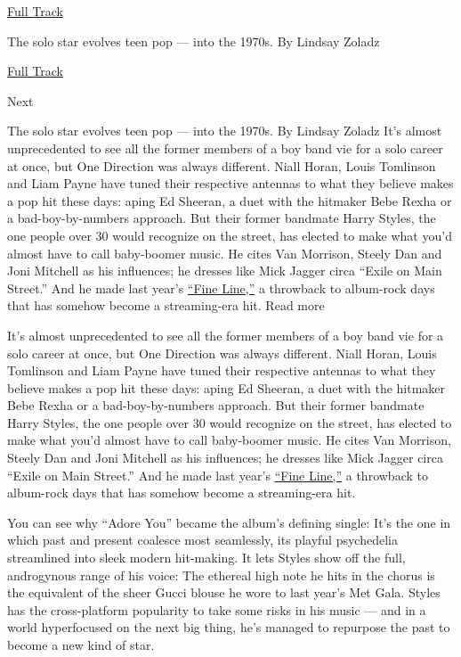 \href{https://open.spotify.com/track/1M4qEo4HE3PRaCOM7EXNJq?si=RynkgC_oSaCIc7mojYTzhA}{
Full Track}

The solo star evolves teen pop --- into the 1970s. By Lindsay Zoladz

\href{https://open.spotify.com/track/1M4qEo4HE3PRaCOM7EXNJq?si=RynkgC_oSaCIc7mojYTzhA}{Full
Track }

Next

The solo star evolves teen pop --- into the 1970s. By Lindsay Zoladz
It's almost unprecedented to see all the former members of a boy band
vie for a solo career at once, but One Direction was always different.
Niall Horan, Louis Tomlinson and Liam Payne have tuned their respective
antennas to what they believe makes a pop hit these days: aping Ed
Sheeran, a duet with the hitmaker Bebe Rexha or a bad-boy-by-numbers
approach. But their former bandmate Harry Styles, the one people over 30
would recognize on the street, has elected to make what you'd almost
have to call baby-boomer music. He cites Van Morrison, Steely Dan and
Joni Mitchell as his influences; he dresses like Mick Jagger circa
``Exile on Main Street.'' And he made last year's
\href{https://www.nytimes3xbfgragh.onion/2019/12/23/arts/music/harry-styles-fine-line-billboard.html}{``Fine
Line,''} a throwback to album-rock days that has somehow become a
streaming-era hit. Read more

It's almost unprecedented to see all the former members of a boy band
vie for a solo career at once, but One Direction was always different.
Niall Horan, Louis Tomlinson and Liam Payne have tuned their respective
antennas to what they believe makes a pop hit these days: aping Ed
Sheeran, a duet with the hitmaker Bebe Rexha or a bad-boy-by-numbers
approach. But their former bandmate Harry Styles, the one people over 30
would recognize on the street, has elected to make what you'd almost
have to call baby-boomer music. He cites Van Morrison, Steely Dan and
Joni Mitchell as his influences; he dresses like Mick Jagger circa
``Exile on Main Street.'' And he made last year's
\href{https://www.nytimes3xbfgragh.onion/2019/12/23/arts/music/harry-styles-fine-line-billboard.html}{``Fine
Line,''} a throwback to album-rock days that has somehow become a
streaming-era hit.

You can see why ``Adore You'' became the album's defining single: It's
the one in which past and present coalesce most seamlessly, its playful
psychedelia streamlined into sleek modern hit-making. It lets Styles
show off the full, androgynous range of his voice: The ethereal high
note he hits in the chorus is the equivalent of the sheer Gucci blouse
he wore to last year's Met Gala. Styles has the cross-platform
popularity to take some risks in his music --- and in a world
hyperfocused on the next big thing, he's managed to repurpose the past
to become a new kind of star.

